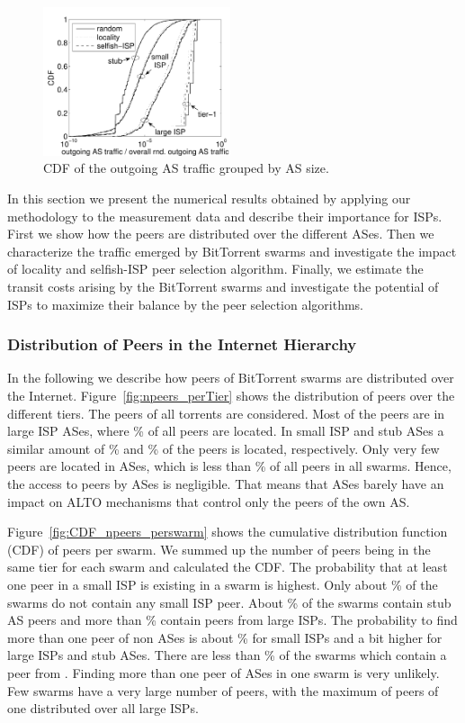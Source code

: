 \begin{figure}
	\centering
	\includegraphics[width=0.49\textwidth]{aslevel/p2p/results/figs/outgoing_CDF}
 	\caption{CDF of the outgoing AS traffic grouped by AS size.}
 	\label{fig:outgoing_CDF}
\end{figure}

In this section we present the numerical results obtained by applying our methodology to the measurement data and describe their importance for ISPs. First we show how the peers are distributed over the different ASes. Then we characterize the traffic emerged by BitTorrent swarms and investigate the impact of locality and selfish-ISP peer selection algorithm. Finally, we estimate the transit costs arising by the BitTorrent swarms and investigate the potential of ISPs to maximize their balance by the peer selection algorithms.

\subsubsection{Distribution of Peers in the Internet Hierarchy}
In the following we describe how peers of BitTorrent swarms are distributed over the Internet.
Figure~\ref{fig:npeers_perTier} shows the distribution of peers over the different tiers. The peers of all torrents are considered. Most of the peers are in large ISP ASes, where \unit[40]{\%} of all peers are located. In small ISP and stub ASes a similar amount of \unit[29]{\%} and \unit[31]{\%} of the peers is located, respectively. Only very few peers are located in \tier ASes, which is less than \unit[1]{\%} of all peers in all swarms. Hence, the access to peers by \tier ASes is negligible. That means that \tier ASes barely have an impact on ALTO mechanisms that control only the peers of the own AS.

Figure~\ref{fig:CDF_npeers_perswarm} shows the cumulative distribution function (CDF) of peers per swarm. We summed up the number of peers being in the same tier for each swarm and calculated the CDF. The probability that at least one peer in a small ISP is existing in a swarm is highest. Only about \unit[2]{\%} of the swarms do not contain any small ISP peer. About \unit[57]{\%} of the swarms contain stub AS peers and more than \unit[60]{\%} contain peers from large ISPs. The probability to find more than one peer of non \tier ASes is about \unit[45]{\%} for small ISPs and a bit higher for large ISPs and stub ASes. There are less than \unit[10]{\%} of the swarms which contain a peer from \tier. Finding more than one peer of \tier ASes in one swarm is very unlikely. Few swarms have a very large number of peers, with the maximum of  peers of one distributed over all large ISPs.

